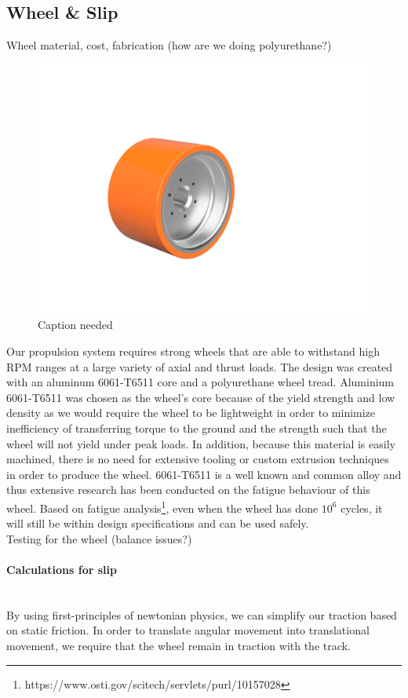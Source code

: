 \documentclass{report}
\let\oldparagraph\paragraph
\renewcommand{\paragraph}[1]{\oldparagraph{#1}\mbox{}\\}
\begin{document}
    \subsection{Wheel \& Slip}
    Wheel material, cost, fabrication (how are we doing polyurethane?)
    \begin{figure}[H]
        \centering
        \includegraphics[width=\linewidth]{fig19}
        \caption{Caption needed}
    \end{figure}
    Our propulsion system requires strong wheels that are able to withstand high RPM ranges at a large variety of axial and thrust loads. The design was created with an aluminum 6061-T6511 core and a polyurethane wheel tread. Aluminium 6061-T6511 was chosen as the wheel’s core because of the yield strength and low density as we would require the wheel to be lightweight in order to minimize inefficiency of transferring torque to the ground and the strength such that the wheel will not yield under peak loads. In addition, because this material is easily machined, there is no need for extensive tooling or custom extrusion techniques in order to produce the wheel. 6061-T6511 is a well known and common alloy and thus extensive research has been conducted on the fatigue behaviour of this wheel. Based on fatigue analysis\footnote{ https://www.osti.gov/scitech/servlets/purl/10157028}, even when the wheel has done $10^6$ cycles, it will still be within design specifications and can be used safely.\\
    
    Testing for the wheel (balance issues?)
    
    \paragraph{Calculations for slip}
    By using first-principles of newtonian physics, we can simplify our traction based on static friction. In order to translate angular movement into translational movement, we require that the wheel remain in traction with the track.\\
    
\end{document}
